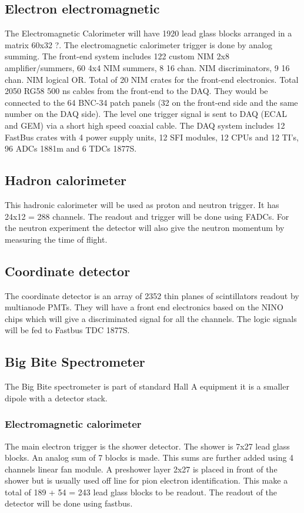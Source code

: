 \documentclass{article}
\begin{document}
\subsection{Electron electromagnetic}
The Electromagnetic Calorimeter will have 1920 lead glass blocks arranged in a matrix 60x32 ?. The electromagnetic calorimeter trigger is done by analog summing. 
The front-end system includes 122 custom NIM 2x8 amplifier/summers, 60
4x4 NIM summers, 8 16 chan. NIM discriminators, 9 16 chan. NIM logical OR.
Total of 20 NIM crates for the front-end electronics. Total 2050 RG58 500 ns
cables from the front-end to the DAQ. They would be connected to the 64
BNC-34 patch panels (32 on the front-end side and the same number on the
DAQ side). The level one trigger signal is sent to DAQ (ECAL and GEM) via a
short high speed coaxial cable.
The DAQ system includes 12 FastBus crates with 4 power supply units, 12 SFI
modules, 12 CPUs and 12 TI’s, 96 ADCs 1881m and 6 TDCs 1877S.

\subsection{Hadron calorimeter}
This hadronic calorimeter will be used as proton and neutron trigger.
It has 24x12 = 288 channels. The readout and trigger will be done using FADCs.
For the neutron experiment the detector will also give the neutron momentum by measuring the time of flight.

\subsection{Coordinate detector}
The coordinate detector is an array of 2352 thin planes of scintillators readout by multianode PMTs. They will have a front end electronics based on the NINO chips which will give a discriminated signal for all the channels. The logic signals will be fed to Fastbus TDC 1877S. 
\subsection{Big Bite Spectrometer}
The Big Bite spectrometer is part of standard Hall A equipment it is a smaller dipole with a detector stack.
\subsubsection{Electromagnetic calorimeter}
The main electron trigger is the shower detector. The shower is 7x27 lead glass blocks. An analog sum of 7 blocks is made. This sums are further added using 4 channels linear fan module.
A preshower layer 2x27 is placed in front of the shower but is usually used off line for pion electron identification. This make a total of 189 + 54 = 243 lead glass blocks to be readout.
The readout of the detector will be done using fastbus.
\end{document}
